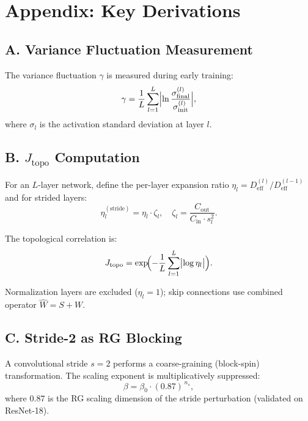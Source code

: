 \documentclass[11pt, a4paper]{article}
\theoremstyle{plain}
\begin{document}
\section*{Appendix: Key Derivations}

\subsection*{A. Variance Fluctuation Measurement}

The variance fluctuation $\gamma$ is measured during early training:
\begin{equation}
\gamma = \frac{1}{L}\sum_{l=1}^{L}\Bigl|\ln\frac{\sigma_{\mathrm{final}}^{(l)}}{\sigma_{\mathrm{init}}^{(l)}}\Bigr|,
\end{equation}
where $\sigma_l$ is the activation standard deviation at layer $l$.

\subsection*{B. $J_{\mathrm{topo}}$ Computation}

For an $L$-layer network, define the per-layer expansion ratio $\eta_l = D_{\mathrm{eff}}^{(l)}/D_{\mathrm{eff}}^{(l-1)}$ and for strided layers:
\begin{equation}
\eta_l^{(\mathrm{stride})} = \eta_l \cdot \zeta_l, \quad \zeta_l = \frac{C_{\mathrm{out}}}{C_{\mathrm{in}} \cdot s_l^2}.
\end{equation}

The topological correlation is:
\begin{equation}
J_{\mathrm{topo}} = \exp\!\Bigl(-\frac{1}{L}\sum_{l=1}^{L}\bigl|\log\eta_l\bigr|\Bigr).
\end{equation}

Normalization layers are excluded ($\eta_l = 1$); skip connections use combined operator $\widehat{W} = S + W$.

\subsection*{C. Stride-2 as RG Blocking}

A convolutional stride $s=2$ performs a coarse-graining (block-spin) transformation. The scaling exponent is multiplicatively suppressed:
\begin{equation}
\beta = \beta_0 \cdot (0.87)^{\,n_s},
\end{equation}
where $0.87$ is the RG scaling dimension of the stride perturbation (validated on ResNet-18).
\end{document}
